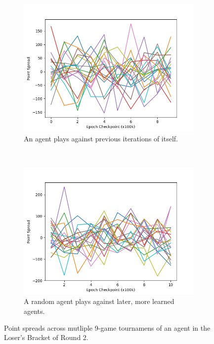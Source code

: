 
\begin{figure}
\center

\begin{subfigure}[b]{0.45\textwidth}
	\includegraphics[width=\linewidth]{images/findings/round2/spreads_self-v-prev_loser.png}
	\caption{An agent plays against previous iterations of itself.}
	\label{fig:r2-spreads-loser-a}
\end{subfigure}
~
\begin{subfigure}[b]{0.45\textwidth}
	\includegraphics[width=\linewidth]{images/findings/round2/spreads_rand-v-fut_loser.png}
	\caption{A random agent plays against later, more learned agents.}
	\label{fig:r2-spreads-loser-b}
\end{subfigure}

\caption{
	Point spreads across mutliple 9-game tournamens of an agent in the
	Loser's Bracket of Round 2.
}
\label{fig:r2-spreads-loser}
\end{figure}
